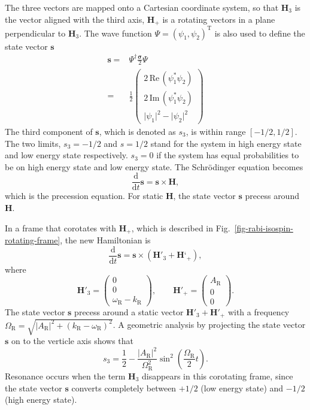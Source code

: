 \documentclass[%
reprint,
 amsmath,amssymb,
 aps,
]{revtex4-1}
\begin{document}
The three vectors are mapped onto a Cartesian coordinate system, so that $\mathbf{H}_3$ is the vector aligned with the third axis, $\mathbf{H}_+$ is a rotating vectors in a plane perpendicular to $\mathbf{H}_3$. The wave function $\Psi=(\psi_1,\psi_2)^{\mathrm{T}}$ is also used to define the state vector $\mathbf{s}$
\begin{align}
    \mathbf{s} =& \Psi^\dagger \frac{\boldsymbol{\sigma}}{2}\Psi \\
    =& \frac{1}{2}\begin{pmatrix}
    2\,\mathrm{Re}\,(\psi_1^* \psi_2) \\
    2\,\mathrm{Im}\,(\psi_1^*\psi_2) \\
    \lvert \psi_1 \rvert^2 - \lvert \psi_2 \rvert^2
    \end{pmatrix}
\end{align}
The third component of $\mathbf{s}$, which is denoted as $s_3$, is within range $[-1/2,1/2]$. The two limits, $s_3=-1/2$ and $s=1/2$ stand for the system in high energy state and low energy state respectively. $s_3=0$ if the system has equal probabilities to be on high energy state and low energy state. The Schr\"odinger equation becomes
\begin{equation}
\frac{\mathrm{d}}{\mathrm{d} t } \mathbf{s} = \mathbf{s} \times \mathbf{H},
\end{equation}
which is the precession equation. For static $\mathbf{H}$, the state vector $\mathbf{s}$ precess around $\mathbf{H}$. 

In a frame that corotates with $\mathbf{H}_+$, which is described in Fig.~\ref{fig-rabi-isospin-rotating-frame}, the new Hamiltonian is
\begin{equation}
\frac{\mathrm d}{\mathrm d t } \mathbf{s} = \mathbf{s} \times (\mathbf{H}'_3 + \mathbf{H}‘_+),
\end{equation}
where
\begin{equation}
\mathbf{H}'_3 = \begin{pmatrix}
    0 \\ 0 \\ 　\omega_{\mathrm{R}} - k_{\mathrm R}
    \end{pmatrix}, \qquad \mathbf{H}'_+ = \begin{pmatrix}
    A_{\mathrm{R}} \\ 0 \\ 　0
    \end{pmatrix}.
\end{equation}
The state vector $\mathbf{s}$ precess around a static vector $\mathbf{H}'_3 + \mathbf{H}'_+$ with a frequency $\Omega_{\mathrm R} = \sqrt{ \lvert A_{\mathrm{R}}\rvert^2 + (k_{\mathrm{R}} - \omega_{\mathrm R})^2 }$. A geometric analysis by projecting the state vector $\mathbf{s}$ on to the verticle axis shows that
\begin{equation}
s_3 = \frac{1}{2} - \frac{\lvert A_{\mathrm R}\rvert ^2}{\Omega_{\mathrm R}^2}\sin^2\left(\frac{\Omega_{\mathrm R}}{2} t\right).
\end{equation}
Resonance occurs when the term $\mathbf{H}_3$ disappears in this corotating frame, since the state vector $\mathbf{s}$ converts completely between $+1/2$ (low energy state) and $-1/2$ (high energy state).
\end{document}
